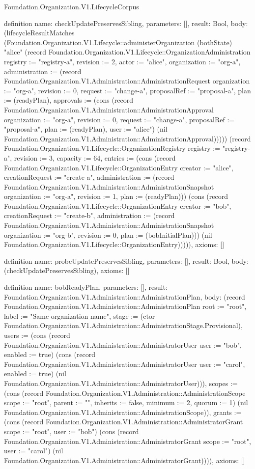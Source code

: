 \begin{lexlean}{Foundation.Organization.V1.LifecycleCorpus}
\begin{semanticmodule}
definition{
  name: checkUpdatePreservesSibling,
  parameters: [],
  result: Bool,
  body: (lifecycleResultMatches (Foundation.Organization.V1.Lifecycle::administerOrganization (bothState) "alice" (record Foundation.Organization.V1.Lifecycle::OrganizationAdministration {registry := "registry-a", revision := 2, actor := "alice", organization := "org-a", administration := (record Foundation.Organization.V1.Administration::AdministrationRequest {organization := "org-a", revision := 0, request := "change-a", proposalRef := "proposal-a", plan := (readyPlan), approvals := (cons (record Foundation.Organization.V1.Administration::AdministrationApproval {organization := "org-a", revision := 0, request := "change-a", proposalRef := "proposal-a", plan := (readyPlan), user := "alice"}) (nil Foundation.Organization.V1.Administration::AdministrationApproval))})})) (record Foundation.Organization.V1.Lifecycle::OrganizationRegistry {registry := "registry-a", revision := 3, capacity := 64, entries := (cons (record Foundation.Organization.V1.Lifecycle::OrganizationEntry {creator := "alice", creationRequest := "create-a", administration := (record Foundation.Organization.V1.Administration::AdministrationSnapshot {organization := "org-a", revision := 1, plan := (readyPlan)})}) (cons (record Foundation.Organization.V1.Lifecycle::OrganizationEntry {creator := "bob", creationRequest := "create-b", administration := (record Foundation.Organization.V1.Administration::AdministrationSnapshot {organization := "org-b", revision := 0, plan := (bobInitialPlan)})}) (nil Foundation.Organization.V1.Lifecycle::OrganizationEntry)))})),
  axioms: []
}

definition{
  name: probeUpdatePreservesSibling,
  parameters: [],
  result: Bool,
  body: (checkUpdatePreservesSibling),
  axioms: []
}

definition{
  name: bobReadyPlan,
  parameters: [],
  result: Foundation.Organization.V1.Administration::AdministrationPlan,
  body: (record Foundation.Organization.V1.Administration::AdministrationPlan {root := "root", label := "Same organization name", stage := (ctor Foundation.Organization.V1.Administration::AdministrationStage.Provisional), users := (cons (record Foundation.Organization.V1.Administration::AdministratorUser {user := "bob", enabled := true}) (cons (record Foundation.Organization.V1.Administration::AdministratorUser {user := "carol", enabled := true}) (nil Foundation.Organization.V1.Administration::AdministratorUser))), scopes := (cons (record Foundation.Organization.V1.Administration::AdministrationScope {scope := "root", parent := "", inherits := false, minimum := 2, quorum := 1}) (nil Foundation.Organization.V1.Administration::AdministrationScope)), grants := (cons (record Foundation.Organization.V1.Administration::AdministratorGrant {scope := "root", user := "bob"}) (cons (record Foundation.Organization.V1.Administration::AdministratorGrant {scope := "root", user := "carol"}) (nil Foundation.Organization.V1.Administration::AdministratorGrant)))}),
  axioms: []
}


\end{semanticmodule}
\end{lexlean}
